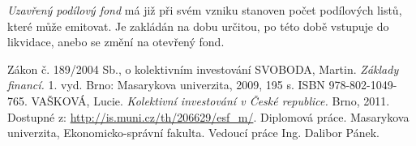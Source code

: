 \documentclass[12pt,a4paper]{article}
\begin{document}
\emph{Uzavřený podílový fond} má již při svém vzniku stanoven počet podílových listů, které může emitovat. Je zakládán na dobu určitou, po této době vstupuje do likvidace, anebo se změní na otevřený fond.



\newpage

\renewcommand{\refname}{Seznam použité literatury}
\begin{thebibliography}{9}
\thispagestyle{plain}
 Zákon č. 189/2004 Sb., o kolektivním investování
 SVOBODA, Martin. \emph{Základy financí.} 1. vyd. Brno: Masarykova univerzita, 2009, 195 s. ISBN 978-802-1049-765. 
 VAŠKOVÁ, Lucie. \emph{Kolektivní investování v České republice.} Brno, 2011. Dostupné z: \url{http://is.muni.cz/th/206629/esf_m/}. Diplomová práce. Masarykova univerzita, Ekonomicko-správní fakulta. Vedoucí práce Ing. Dalibor Pánek.
\end{thebibliography}
\end{document}
